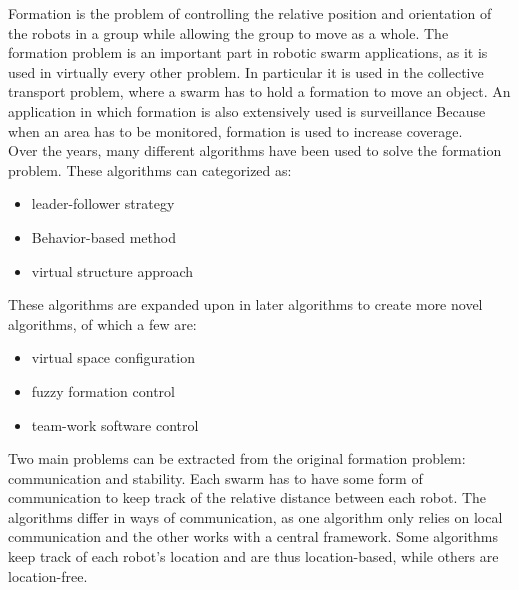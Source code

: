 
Formation is the problem of controlling the relative position and orientation of the robots in a group while allowing the group to move as a whole. \cite{consolini2008leader}
The formation problem is an important part in robotic swarm applications, as it is used in virtually every other problem. 
In particular it is used in the collective transport problem, where a swarm has to hold a formation to move an object. 
An application in which formation is also extensively used is surveillance
Because when an area has to be monitored, formation is used to increase coverage. \cite{burkle2011towards} \\

Over the years, many different algorithms have been used to solve the formation problem. \cite{chen2005formation} \cite{consolini2008leader}
These algorithms can categorized as:

\begin{itemize}
	\item leader-follower strategy \cite{consolini2008leader} \cite{das2002vision}
	\item Behavior-based method \cite{balch1998behavior} \cite{lawton2003decentralized}
	\item virtual structure approach \cite{ren2004decentralized} \cite{do2007nonlinear}
\end{itemize}

These algorithms are expanded upon in later algorithms to create more novel algorithms, of which a few are:

\begin{itemize}
	\item virtual space configuration \cite{wee2013formation}
	\item fuzzy formation control \cite{ranjbar2012novel}
	\item team-work software control \cite{kaminka2013use}
\end{itemize}

Two main problems can be extracted from the original formation problem: communication and stability. 
Each swarm has to have some form of communication to keep track of the relative distance between each robot. 
The algorithms differ in ways of communication, as one algorithm only relies on local communication and the other works with a central framework.
Some algorithms keep track of each robot's location and are thus location-based, while others are location-free. \\

